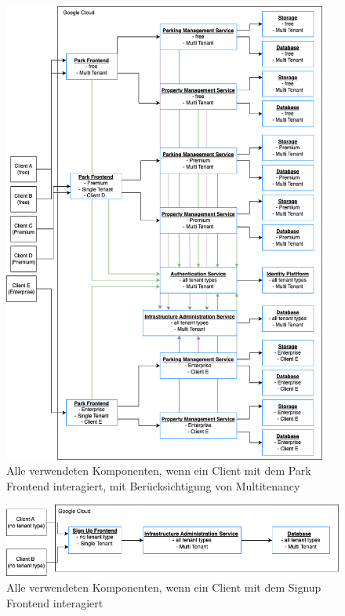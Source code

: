 
\begin{figure}[ht]
  \centering
  \includegraphics[width=0.95\textwidth]{resources/03-runtime-view/components-park-frontend.png}
  \caption{Alle verwendeten Komponenten, wenn ein Client mit dem Park Frontend interagiert, mit Berücksichtigung von Multitenancy}
  \label{fig:03-components-park-frontend}
\end{figure}

\begin{figure}[ht]
  \centering
  \includegraphics[width=\textwidth]{resources/03-runtime-view/components-signup-frontend.png}
  \caption{Alle verwendeten Komponenten, wenn ein Client mit dem Signup Frontend interagiert}
  \label{fig:03-components-signup-frontend}
\end{figure}

